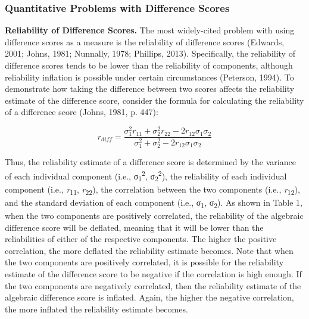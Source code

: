 \documentclass[authordate, meta, issue]{jote-new-article}
\begin{document}
	\subsubsection{Quantitative Problems with Difference Scores}



	\textbf{Reliability of Difference Scores. }The most widely-cited problem with using difference scores as a measure is the reliability of difference scores (Edwards, 2001; Johns, 1981; Nunnally, 1978; Phillips, 2013). Specifically, the reliability of difference scores tends to be lower than the reliability of components, although reliability inflation is possible under certain circumstances (Peterson, 1994). To demonstrate how taking the difference between two scores affects the reliability estimate of the difference score, consider the formula for calculating the reliability of a difference score (Johns, 1981, p. 447):



	\begin{equation}
		r_{diff}=\frac{\sigma_1^2r_{11}+\sigma_2^2r_{22}-2r_{12}\sigma_1\sigma_2}{\sigma_1^2+\sigma_2^2-2r_{12}\sigma_1\sigma_2}
	\end{equation}



	Thus, the reliability estimate of a difference score is determined by the variance of each individual component (i.e., σ\textsubscript{1}\textsuperscript{2}, σ\textsubscript{2}\textsuperscript{2}), the reliability of each individual component (i.e., \emph{r}\textsubscript{11}, \emph{r}\textsubscript{22}), the correlation between the two components (i.e., \emph{r}\textsubscript{12}), and the standard deviation of each component (i.e., σ\textsubscript{1}, σ\textsubscript{2}). As shown in Table 1, when the two components are positively correlated, the reliability of the algebraic difference score will be deflated, meaning that it will be lower than the reliabilities of either of the respective components. The higher the positive correlation, the more deflated the reliability estimate becomes. Note that when the two components are positively correlated, it is possible for the reliability estimate of the difference score to be negative if the correlation is high enough. If the two components are negatively correlated, then the reliability estimate of the algebraic difference score is inflated. Again, the higher the negative correlation, the more inflated the reliability estimate becomes.
\end{document}
